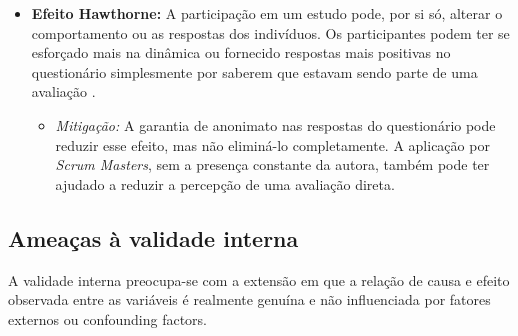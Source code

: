 \documentclass[
	12pt,
	openright,
	twoside,
	a4paper,
	english,
	brazil
	]{abntex2}
\begin{document}
\begin{itemize}
\begin{itemize}
    \end{itemize}
  \item \textbf{Efeito Hawthorne:} A participação em um estudo pode, por si só, alterar o comportamento ou as respostas dos indivíduos. Os participantes podem ter se esforçado mais na dinâmica ou fornecido respostas mais positivas no questionário simplesmente por saberem que estavam sendo parte de uma avaliação \cite{nngroup_hawthorne}.
  \begin{itemize}
    \item \textit{Mitigação:} A garantia de anonimato nas respostas do questionário pode reduzir esse efeito, mas não eliminá-lo completamente. A aplicação por \textit{Scrum Masters}, sem a presença constante da autora, também pode ter ajudado a reduzir a percepção de uma avaliação direta.
    \end{itemize}
\end{itemize}

\subsection{Ameaças à validade interna}
\label{sec:ameacas-interna}

A validade interna preocupa-se com a extensão em que a relação de causa e efeito observada entre as variáveis é realmente genuína e não influenciada por fatores externos ou confounding factors.
\end{document}

